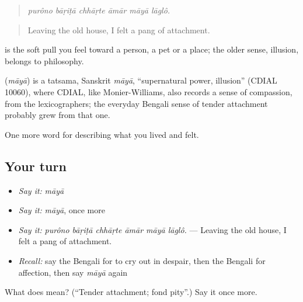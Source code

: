 \begin{quote}
     
\end{quote}

\begin{quote}
\emph{purôno bāṛiṭā chhāṛte āmār māyā lāglô.}
\end{quote}

\begin{quote}
Leaving the old house, I felt a pang of attachment.
\end{quote}

 is the soft pull you feel toward a person, a pet or a place; the older sense, illusion, belongs to philosophy.

\begin{cousinweb}
\textbf{} (\emph{māyā}) is a tatsama, Sanskrit \emph{māyā}, \textquotedblleft{}supernatural power, illusion\textquotedblright{} (CDIAL 10060), where CDIAL, like Monier-Williams, also records a sense of compassion, from the lexicographers; the everyday Bengali sense of tender attachment probably grew from that one.
\end{cousinweb}

\begin{grammarlens}[title={What you've built}]
One more word for describing what you lived and felt.
\end{grammarlens}

\subsection*{Your turn}
\begin{itemize}
\raggedright
  \item \emph{Say it:} \emph{māyā}
  \item \emph{Say it:} \emph{māyā}, once more
  \item \emph{Say it:} \emph{purôno bāṛiṭā chhāṛte āmār māyā lāglô.} — Leaving the old house, I felt a pang of attachment.
  \item \emph{Recall:} say the Bengali for to cry out in despair, then the Bengali for affection, then say \emph{māyā} again
\end{itemize}

\begin{tcolorbox}[breakable,colback=teal!4,colframe=teal!35!black,title={Before you move on}]
What does  mean? (\textquotedblleft{}Tender attachment; fond pity\textquotedblright{}.) Say it once more.
\end{tcolorbox}
